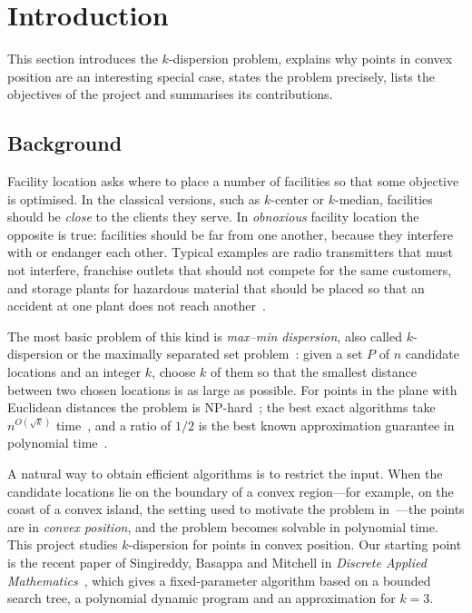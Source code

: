 \chapter{Introduction}\label{ch:intro}

\begin{chapterabstract}
This section introduces the $k$-dispersion problem, explains why points in
convex position are an interesting special case, states the problem
precisely, lists the objectives of the project and summarises its
contributions.
\end{chapterabstract}

\section{Background}

Facility location asks where to place a number of facilities so that some
objective is optimised. In the classical versions, such as $k$-center or
$k$-median, facilities should be \emph{close} to the clients they serve. In
\emph{obnoxious} facility location the opposite is true: facilities should be
far from one another, because they interfere with or endanger each other.
Typical examples are radio transmitters that must not interfere, franchise
outlets that should not compete for the same customers, and storage plants for
hazardous material that should be placed so that an accident at one plant does
not reach another~\citep{tamir,ravi}.

The most basic problem of this kind is \emph{max--min dispersion}, also called
$k$-dispersion or the maximally separated set problem~\citep{agarwal}: given a
set $P$ of $n$ candidate locations and an integer $k$, choose $k$ of them so
that the smallest distance between two chosen locations is as large as
possible. For points in the plane with Euclidean distances the problem is
NP-hard~\citep{wangkuo}; the best exact algorithms take $n^{O(\sqrt k)}$
time~\citep{akagi}, and a ratio of $1/2$ is the best known approximation
guarantee in polynomial time~\citep{ravi,tamir}.

A natural way to obtain efficient algorithms is to restrict the input. When the
candidate locations lie on the boundary of a convex region---for example, on
the coast of a convex island, the setting used to motivate the problem
in~\citet{sbm}---the points are in \emph{convex position}, and the problem
becomes solvable in polynomial time. This project studies $k$-dispersion for
points in convex position. Our starting point is the recent paper of
Singireddy, Basappa and Mitchell in \emph{Discrete Applied
Mathematics}~\citep{sbm}, which gives a fixed-parameter algorithm based on a
bounded search tree, a polynomial dynamic program and an approximation for
$k=3$.

